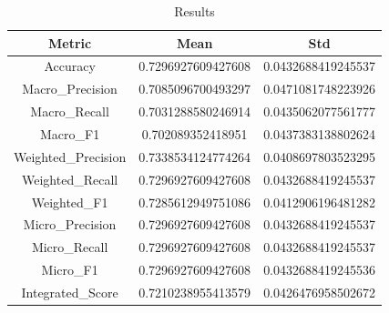 \begin{table}[htbp]
\centering
\caption{Results}
\label{tab:csv}
\small
\setlength{\tabcolsep}{4pt}
\begin{tabular}{|c|c|c|}
\hline
Metric & Mean & Std \\
\hline
Accuracy & 0.7296927609427608 & 0.0432688419245537 \\
Macro_Precision & 0.7085096700493297 & 0.0471081748223926 \\
Macro_Recall & 0.7031288580246914 & 0.0435062077561777 \\
Macro_F1 & 0.702089352418951 & 0.0437383138802624 \\
Weighted_Precision & 0.7338534124774264 & 0.0408697803523295 \\
Weighted_Recall & 0.7296927609427608 & 0.0432688419245537 \\
Weighted_F1 & 0.7285612949751086 & 0.0412906196481282 \\
Micro_Precision & 0.7296927609427608 & 0.0432688419245537 \\
Micro_Recall & 0.7296927609427608 & 0.0432688419245537 \\
Micro_F1 & 0.7296927609427608 & 0.0432688419245536 \\
Integrated_Score & 0.7210238955413579 & 0.0426476958502672 \\
\hline
\end{tabular}
\end{table}